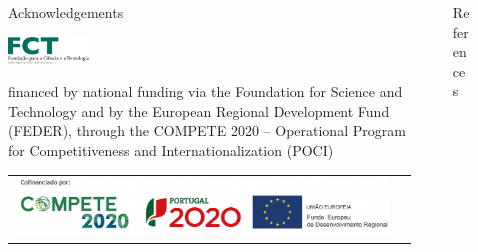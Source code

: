 \documentclass[final]{beamer}
\newlength{\sepmargin}
\newlength{\sepwid}
\newlength{\onecolwid}
\begin{document}
\begin{frame}[t]
      \begin{columns}[t] %
      
      \begin{column}{\sepmargin} \end{column}
        \begin{column}{\onecolwid} %
			\begin{block}{\large Acknowledgements}
            
              \vspace{0.3in}
              \includegraphics[width=0.2\textwidth]{FCT.png}
              \begin{minipage}{0.65\textwidth} %
                \footnotesize financed by national funding via the Foundation for Science and Technology and by the European Regional Development Fund (FEDER), through the COMPETE 2020 – Operational Program for Competitiveness and Internationalization (POCI)
               \end{minipage}
           
                   \begin{tabular}{SL}                    	                        			 	\includegraphics[width=8in]{FCT2.png}
                   \end{tabular}
				\end{block}	
               
		    \end{column} %
			\begin{column}{\sepwid}\end{column} %
			\begin{column}{\onecolwid} %
              \begin{block}{\large References}
			  \vspace*{-0.5cm}
					{\footnotesize
				}
				\end{block} 
			\end{column} %
            
			\begin{column}{\sepmargin}\end{column} %
            
\end{columns} %


\end{frame} %
	
\end{document}
